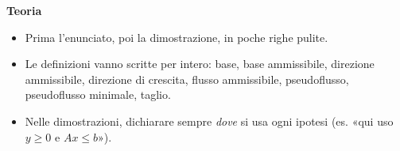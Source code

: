 \documentclass[11pt,a4paper]{article}
\begin{document}
\begin{idea}
\textbf{Teoria}
\begin{itemize}
\item Prima l'enunciato, poi la dimostrazione, in poche righe pulite.
\item Le definizioni vanno scritte per intero: base, base ammissibile, direzione ammissibile,
      direzione di crescita, flusso ammissibile, pseudoflusso, pseudoflusso minimale, taglio.
\item Nelle dimostrazioni, dichiarare sempre \emph{dove} si usa ogni ipotesi
      (es. «qui uso $y\ge0$ e $Ax\le b$»).
\end{itemize}
\end{idea}
\end{document}
